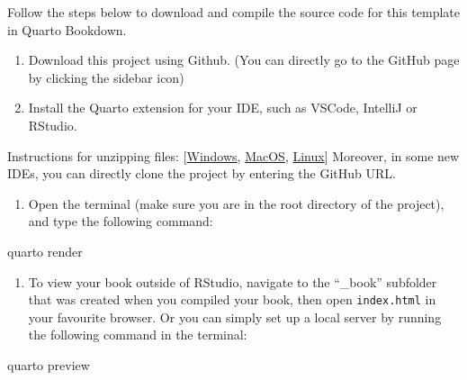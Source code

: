 \documentclass[
  letterpaper,
  oneside]{book}
\newenvironment{Shaded}{\begin{snugshade}}{\end{snugshade}}
\newcommand{\ExtensionTok}[1]{\textcolor[rgb]{0.00,0.23,0.31}{#1}}
\newcommand{\NormalTok}[1]{\textcolor[rgb]{0.00,0.23,0.31}{#1}}
\providecommand{\tightlist}{%
  \setlength{\itemsep}{0pt}\setlength{\parskip}{0pt}}\usepackage{longtable,booktabs,array}
\numberwithin{equation}{section}
\numberwithin{figure}{section}
\theoremstyle{break}
\theoremstyle{plain}
\theoremstyle{remark}
\begin{document}
Follow the steps below to download and compile the source code for this
template in Quarto Bookdown.

\begin{enumerate}
\def\labelenumi{\arabic{enumi})}
\tightlist
\item
  Download this project using Github. (You can directly go to the GitHub
  page by clicking the sidebar icon)
\item
  Install the Quarto extension for your IDE, such as VSCode, IntelliJ or
  RStudio.
\end{enumerate}

Instructions for unzipping files:
{[}\href{https://support.microsoft.com/en-us/windows/zip-and-unzip-files-f6dde0a7-0fec-8294-e1d3-703ed85e7ebc?target=_blank}{Windows},
\href{https://support.apple.com/en-gb/guide/mac-help/mchlp2528/mac\#:~:text=Unzip\%20(expand)\%20a\%20compressed\%20item,zip\%20file.?target=_blank}{MacOS},
\href{https://unstop.com/blog/how-to-unzip-a-file-in-linux?target=_blank}{Linux}{]}
Moreover, in some new IDEs, you can directly clone the project by
entering the GitHub URL.

\begin{enumerate}
\def\labelenumi{\arabic{enumi})}
\setcounter{enumi}{2}
\tightlist
\item
  Open the terminal (make sure you are in the root directory of the
  project), and type the following command:
\end{enumerate}

\begin{Shaded}
\begin{Highlighting}[]
\ExtensionTok{quarto}\NormalTok{ render}
\end{Highlighting}
\end{Shaded}

\begin{enumerate}
\def\labelenumi{\arabic{enumi})}
\setcounter{enumi}{3}
\tightlist
\item
  To view your book outside of RStudio, navigate to the ``\_book''
  subfolder that was created when you compiled your book, then open
  \texttt{index.html} in your favourite browser. Or you can simply set
  up a local server by running the following command in the terminal:
\end{enumerate}

\begin{Shaded}
\begin{Highlighting}[]
\ExtensionTok{quarto}\NormalTok{ preview}
\end{Highlighting}
\end{Shaded}
\end{document}
